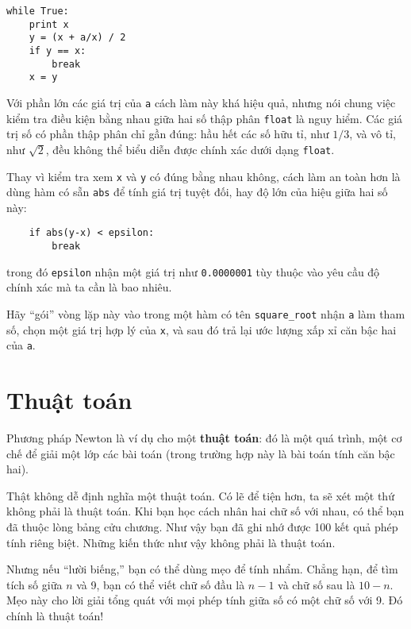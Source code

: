 \documentclass[11pt]{book}
\begin{document}
\beforeverb
\begin{verbatim}
while True:
    print x
    y = (x + a/x) / 2
    if y == x:
        break
    x = y
\end{verbatim}
\afterverb
%
Với phần lớn các giá trị của {\tt a} cách làm này khá hiệu quả,
nhưng nói chung việc kiểm tra điều kiện bằng nhau giữa hai số
thập phân {\tt float} là nguy hiểm. Các giá trị số có phần thập phân
chỉ gần đúng: hầu hết các số hữu tỉ, như $1/3$, và vô tỉ, như
$\sqrt{2}$, đều không thể biểu diễn được chính xác dưới dạng {\tt float}.


Thay vì kiểm tra xem {\tt x} và {\tt y} có đúng bằng nhau không, cách
làm an toàn hơn là dùng hàm có sẵn {\tt abs} để tính giá trị tuyệt đối,
hay độ lớn của hiệu giữa hai số này:

\beforeverb
\begin{verbatim}
    if abs(y-x) < epsilon:
        break
\end{verbatim}
\afterverb
%
trong đó \verb"epsilon" nhận một giá trị như {\tt 0.0000001} tùy thuộc
vào yêu cầu độ chính xác mà ta cần là bao nhiêu.

\begin{ex}
\label{square_root}

Hãy ``gói'' vòng lặp này vào trong một hàm có tên \verb"square_root"
nhận {\tt a} làm tham số, chọn một giá trị hợp lý của {\tt x}, và sau đó
trả lại ước lượng xấp xỉ căn bậc hai của {\tt a}.
\end{ex}


\section{Thuật toán}

Phương pháp Newton là ví dụ cho một {\bf thuật toán}: đó là một
quá trình, một cơ chế để giải một lớp các bài toán (trong trường hợp
này là bài toán tính căn bậc hai).

Thật không dễ định nghĩa một thuật toán. Có lẽ để tiện hơn, ta sẽ
xét một thứ không phải là thuật toán. Khi bạn học cách nhân hai chữ 
số với nhau, có thể bạn đã thuộc lòng bảng cửu chương. Như vậy
bạn đã ghi nhớ được 100 kết quả phép tính riêng biệt. Những
kiến thức như vậy không phải là thuật toán.

Nhưng nếu ``lười biếng,'' bạn có thể dùng mẹo để tính nhẩm.
Chẳng hạn, để tìm tích số giữa $n$ và 9, bạn có thể viết
chữ số đầu là $n-1$ và chữ số sau là $10-n$. Mẹo này cho 
lời giải tổng quát với mọi phép tính giữa số có một chữ số với 9.
Đó chính là thuật toán!
\end{document}
